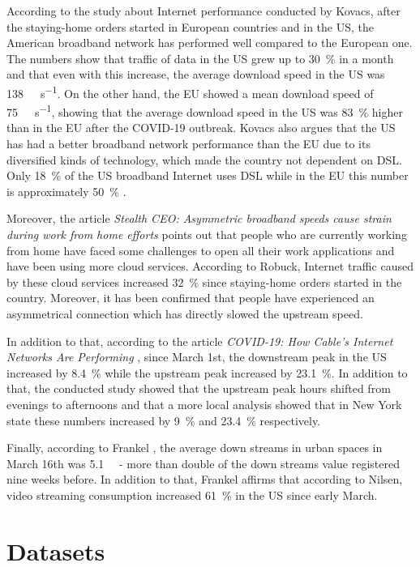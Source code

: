 \documentclass[conference,10pt]{IEEEtran}
\begin{document}
According to the study about Internet performance conducted by Kovacs, after the staying-home orders started in European countries and in the US, the American broadband network has performed well compared to the European one. The numbers show that traffic of data in the US grew up to \SI{30}{\percent} in a month and that even with this increase, the average download speed in the US was \SI{138}{\mega\bit\per\second}. On the other hand, the EU showed a mean download speed of \SI{75}{\mega\bit\per\second}, showing that the average download speed in the US was \SI{83}{\percent} higher than in the EU after the COVID-19 outbreak. Kovacs also argues that the US has had a better broadband network performance than the EU due to its diversified kinds of technology, which made the country not dependent on DSL. Only \SI{18}{\percent} of the US broadband Internet uses DSL while in the EU this number is approximately \SI{50}{\percent} \cite{kovacs}.

Moreover, the article \textit{Stealth CEO: Asymmetric broadband speeds cause strain during work from home efforts} \cite{robuck} points out that people who are currently working from home have faced some challenges to open all their work applications and have been using more cloud services. According to Robuck, Internet traffic caused by these cloud services increased \SI{32}{\percent} since staying-home orders started in the country. Moreover, it has been confirmed that people have experienced an asymmetrical connection which has directly slowed the upstream speed.

In addition to that, according to the article \textit{COVID-19: How Cable's Internet Networks Are Performing} \cite{ncta}, since March 1st, the downstream peak in the US increased by \SI{8.4}{\percent} while the upstream peak increased by \SI{23.1}{\percent}. In addition to that, the conducted study showed that the upstream peak hours shifted from evenings to afternoons and that a more local analysis showed that in New York state these numbers increased by \SI{9}{\percent} and \SI{23.4}{\percent} respectively.

Finally, according to Frankel \cite{frankel}, the average down streams in urban spaces in March 16th was \SI{5.1}{\giga\byte} - more than double of the down streams value registered nine weeks before. In addition to that, Frankel affirms that according to Nilsen, video streaming consumption increased \SI{61}{\percent} in the US since early March.

\section{Datasets}
\label{sec:datasets}
\end{document}
